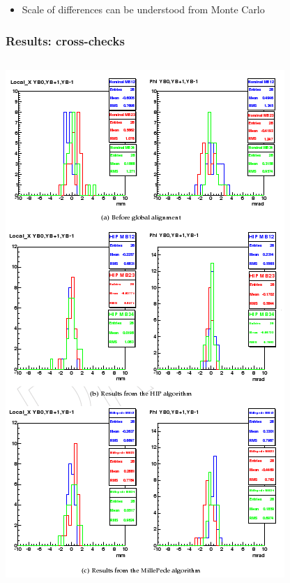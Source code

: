 \documentclass[compress]{beamer}
\begin{document}
\begin{frame}
\begin{itemize}
\item Scale of differences can be understood from Monte Carlo
\end{itemize}
\end{frame}

\begin{frame}
\frametitle{Results: cross-checks}

\begin{columns}
\includegraphics[width=\linewidth]{localcheck.png}


\end{columns}
\end{frame}
\end{document}

